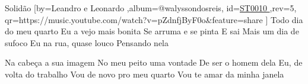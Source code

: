 \beginsong
{Solidão %
}[by={Leandro e Leonardo %
},album={@walyssondosreis},
id={\href{https://music.youtube.com/watch?v=pZdnfjByF0o&feature=share %
}{ST0010 %
}},rev={5}, %
qr={https://music.youtube.com/watch?v=pZdnfjByF0o&feature=share %
}]
\beginverse
Todo dia do meu quarto
Eu a vejo mais bonita
Se arruma e se pinta
E sai
Mais um dia de sufoco
Eu na rua, quase louco
Pensando nela
\endverse

\beginverse
Na cabeça a sua imagem
No meu peito uma vontade
De ser o homem dela
Eu, de volta do trabalho
Vou de novo pro meu quarto
Vou te amar da minha janela
\endverse

